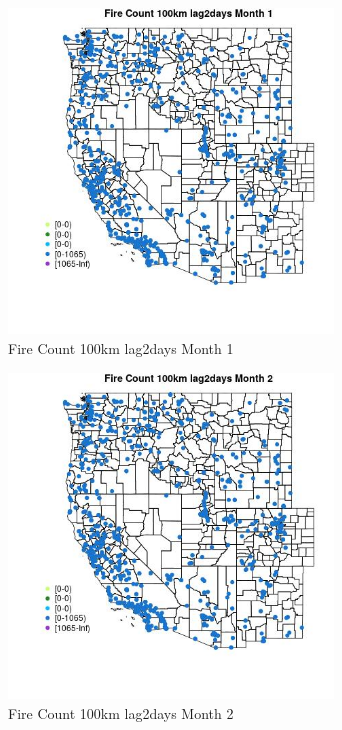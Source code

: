 \begin{figure} 
\centering  
\includegraphics[width=0.77\textwidth]{Code_Outputs/Report_ML_input_PM25_Step4_part_f_de_duplicated_aves_prioritize_24hr_obswNAs_MapObsMo1Fire_Count_100km_lag2days.jpg} 
\caption{\label{fig:Report_ML_input_PM25_Step4_part_f_de_duplicated_aves_prioritize_24hr_obswNAsMapObsMo1Fire_Count_100km_lag2days}Fire Count 100km lag2days Month 1} 
\end{figure} 
 

\begin{figure} 
\centering  
\includegraphics[width=0.77\textwidth]{Code_Outputs/Report_ML_input_PM25_Step4_part_f_de_duplicated_aves_prioritize_24hr_obswNAs_MapObsMo2Fire_Count_100km_lag2days.jpg} 
\caption{\label{fig:Report_ML_input_PM25_Step4_part_f_de_duplicated_aves_prioritize_24hr_obswNAsMapObsMo2Fire_Count_100km_lag2days}Fire Count 100km lag2days Month 2} 
\end{figure} 
 

